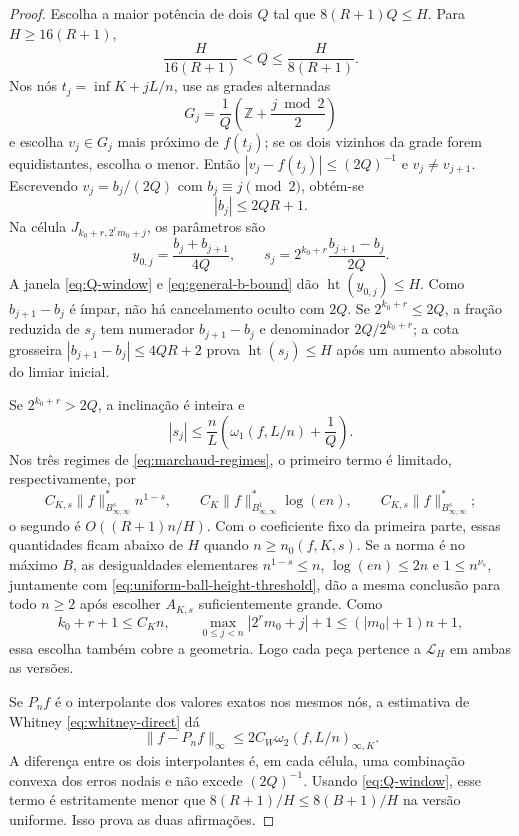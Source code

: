 \documentclass[11pt,a4paper]{article}
\theoremstyle{definition}
\theoremstyle{remark}
\newcommand{\Library}{\mathcal{L}}
\newcommand{\height}{\operatorname{ht}}
\begin{document}
\begin{proof}
Escolha a maior potência de dois $Q$ tal que
$8(R+1)Q\le H$. Para $H\ge16(R+1)$,
\begin{equation}
 \frac{H}{16(R+1)}<Q\le\frac{H}{8(R+1)}.
 \label{eq:Q-window}
\end{equation}
Nos nós $t_j=\inf K+jL/n$, use as grades alternadas
\[
 G_j=\frac1Q\left(\mathbb Z+\frac{j\bmod2}{2}\right)
\]
e escolha $v_j\in G_j$ mais próximo de $f(t_j)$; se os dois vizinhos da grade
forem equidistantes, escolha o menor. Então
$|v_j-f(t_j)|\le(2Q)^{-1}$ e $v_j\ne v_{j+1}$. Escrevendo
$v_j=b_j/(2Q)$ com $b_j\equiv j\pmod2$, obtém-se
\begin{equation}
 |b_j|\le2QR+1.
 \label{eq:general-b-bound}
\end{equation}
Na célula $J_{k_0+r,2^rm_0+j}$, os parâmetros são
\begin{equation}
 y_{0,j}=\frac{b_j+b_{j+1}}{4Q},
 \qquad
 s_j=2^{k_0+r}\frac{b_{j+1}-b_j}{2Q}.
 \label{eq:general-atom-parameters}
\end{equation}
A janela \eqref{eq:Q-window} e \eqref{eq:general-b-bound} dão
$\height(y_{0,j})\le H$. Como $b_{j+1}-b_j$ é ímpar, não há cancelamento
oculto com $2Q$. Se $2^{k_0+r}\le2Q$, a fração reduzida de $s_j$ tem
numerador $b_{j+1}-b_j$ e denominador $2Q/2^{k_0+r}$; a cota grosseira
$|b_{j+1}-b_j|\le4QR+2$ prova $\height(s_j)\le H$ após um aumento absoluto
do limiar inicial.

Se $2^{k_0+r}>2Q$, a inclinação é inteira e
\begin{equation}
 |s_j|
 \le \frac nL\left(\omega_1(f,L/n)+\frac1Q\right).
 \label{eq:slope-marchaud-bound}
\end{equation}
Nos três regimes de \eqref{eq:marchaud-regimes}, o primeiro termo é limitado,
respectivamente, por
\[
 C_{K,s}\|f\|_{B^s_{\infty,\infty}}^*n^{1-s},\qquad
 C_{K}\|f\|_{B^1_{\infty,\infty}}^*\log(en),\qquad
 C_{K,s}\|f\|_{B^s_{\infty,\infty}}^*;
\]
o segundo é $O((R+1)n/H)$. Com o coeficiente fixo da primeira parte, essas
quantidades ficam abaixo de $H$ quando $n\ge n_0(f,K,s)$. Se a norma é no
máximo $B$, as desigualdades elementares
$n^{1-s}\le n$, $\log(en)\le2n$ e $1\le n^{\nu_s}$, juntamente com
\eqref{eq:uniform-ball-height-threshold}, dão a mesma conclusão para todo
$n\ge2$ após escolher $A_{K,s}$ suficientemente grande. Como
\[
 k_0+r+1\le C_Kn,\qquad
 \max_{0\le j<n}|2^rm_0+j|+1\le(|m_0|+1)n+1,
\]
essa escolha também cobre a geometria. Logo cada peça pertence a
$\Library_H$ em ambas as versões.

Se $P_nf$ é o interpolante dos valores exatos nos mesmos nós, a estimativa
de Whitney \eqref{eq:whitney-direct} dá
\[
 \|f-P_nf\|_\infty
 \le2C_W\omega_2(f,L/n)_{\infty,K}.
\]
A diferença entre os dois interpolantes é, em cada célula, uma combinação
convexa dos erros nodais e não excede $(2Q)^{-1}$. Usando
\eqref{eq:Q-window}, esse termo é estritamente menor que
$8(R+1)/H\le8(B+1)/H$ na versão uniforme. Isso prova as duas afirmações.
\end{proof}
\end{document}
